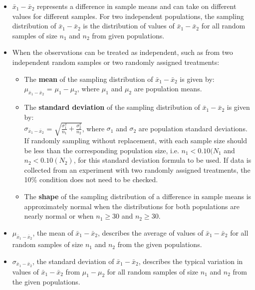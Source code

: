 \begin{itemize}


\item $\bar{x}_1-\bar{x}_2$ represents a difference in sample means and can take on different values for different samples.  For two independent populations, the sampling distribution of $\bar{x}_1-\bar{x}_2$ is the distribution of values of $\bar{x}_1-\bar{x}_2$ for all random samples of size $n_1$ and $n_2$ from given populations.

\item When the observations can be treated as independent, such as from two independent random samples or two randomly assigned treatments:
\begin{itemize}
\item The \textbf{mean} of the sampling distribution of $\bar{x}_1-\bar{x}_2$ is given by:  \\
 $\mu_{\bar{x}_1-\bar{x}_2}$ = $\mu_1-\mu_2$, where $\mu_1$ and $\mu_2$ are population means.

\item The \textbf{standard deviation} of the sampling distribution of $\bar{x}_1-\bar{x}_2$ is given by: \\
$\sigma_{\bar{x}_1-\bar{x}_2}$ =  $ \sqrt{\frac{\sigma_1^2}{n_1} + \frac{\sigma_2^2}{n_2}}$, where $\sigma_1$ and $\sigma_2$ are population standard deviations.  If randomly sampling without replacement, with each sample size should be less than the corresponding population size, i.e. $n_1<0.10(N_1$ and $n_2<0.10(N_2)$, for this standard deviation formula to be used.  If data is collected from an experiment with two randomly assigned treatments, the 10\% condition does not need to be checked.

  \item The \textbf{shape} of the sampling distribution of a difference in sample means is approximately normal when the distributions for both populations are nearly normal or when $n_1\ge 30$ and $n_2\ge 30$.  

\end{itemize}

\item $\mu_{\bar{x}_1-\bar{x}_2}$, the mean of $\bar{x}_1-\bar{x}_2$, describes the average of values of  $\bar{x}_1-\bar{x}_2$ for all random samples of size $n_1$ and $n_2$ from the given populations.  

\item $\sigma_{\bar{x}_1-\bar{x}_2}$, the standard deviation of $\bar{x}_1-\bar{x}_2$, describes the typical variation in values of $\bar{x}_1-\bar{x}_2$ from $\mu_1-\mu_2$ for all random samples of size $n_1$ and $n_2$ from the given populations.  


\end{itemize}
